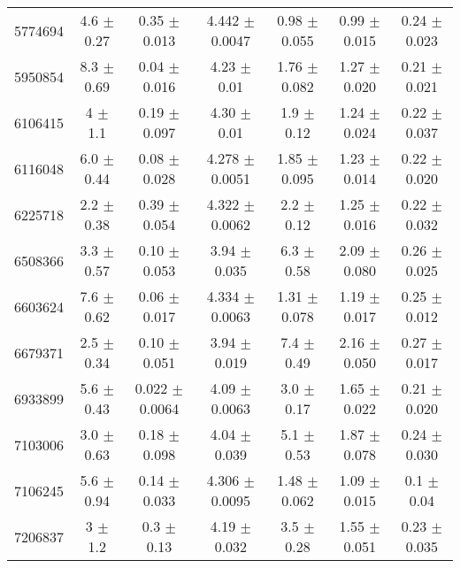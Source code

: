 \begin{table*}
\begin{tabular}{c|cccccc}
5774694  &        4.6    $\pm$  0.27   &      0.35   $\pm$  0.013  &      4.442  $\pm$  0.0047 &      0.98   $\pm$  0.055  &      0.99   $\pm$  0.015  &      0.24   $\pm$  0.023    \\
5950854  &        8.3    $\pm$  0.69   &      0.04   $\pm$  0.016  &      4.23   $\pm$  0.01   &      1.76   $\pm$  0.082  &      1.27   $\pm$  0.020  &      0.21   $\pm$  0.021    \\
6106415  &        4      $\pm$  1.1    &      0.19   $\pm$  0.097  &      4.30   $\pm$  0.01   &      1.9    $\pm$  0.12   &      1.24   $\pm$  0.024  &      0.22   $\pm$  0.037    \\
6116048  &        6.0    $\pm$  0.44   &      0.08   $\pm$  0.028  &      4.278  $\pm$  0.0051 &      1.85   $\pm$  0.095  &      1.23   $\pm$  0.014  &      0.22   $\pm$  0.020    \\
6225718  &        2.2    $\pm$  0.38   &      0.39   $\pm$  0.054  &      4.322  $\pm$  0.0062 &      2.2    $\pm$  0.12   &      1.25   $\pm$  0.016  &      0.22   $\pm$  0.032    \\
6508366  &        3.3    $\pm$  0.57   &      0.10   $\pm$  0.053  &      3.94   $\pm$  0.035  &      6.3    $\pm$  0.58   &      2.09   $\pm$  0.080  &      0.26   $\pm$  0.025    \\
6603624  &        7.6    $\pm$  0.62   &      0.06   $\pm$  0.017  &      4.334  $\pm$  0.0063 &      1.31   $\pm$  0.078  &      1.19   $\pm$  0.017  &      0.25   $\pm$  0.012    \\
6679371  &        2.5    $\pm$  0.34   &      0.10   $\pm$  0.051  &      3.94   $\pm$  0.019  &      7.4    $\pm$  0.49   &      2.16   $\pm$  0.050  &      0.27   $\pm$  0.017    \\
6933899  &        5.6    $\pm$  0.43   &      0.022  $\pm$  0.0064 &      4.09   $\pm$  0.0063 &      3.0    $\pm$  0.17   &      1.65   $\pm$  0.022  &      0.21   $\pm$  0.020    \\
7103006  &        3.0    $\pm$  0.63   &      0.18   $\pm$  0.098  &      4.04   $\pm$  0.039  &      5.1    $\pm$  0.53   &      1.87   $\pm$  0.078  &      0.24   $\pm$  0.030    \\
7106245  &        5.6    $\pm$  0.94   &      0.14   $\pm$  0.033  &      4.306  $\pm$  0.0095 &      1.48   $\pm$  0.062  &      1.09   $\pm$  0.015  &      0.1    $\pm$  0.04     \\
7206837  &        3      $\pm$  1.2    &      0.3    $\pm$  0.13   &      4.19   $\pm$  0.032  &      3.5    $\pm$  0.28   &      1.55   $\pm$  0.051  &      0.23   $\pm$  0.035    \\

\end{tabular}
\end{table*}
